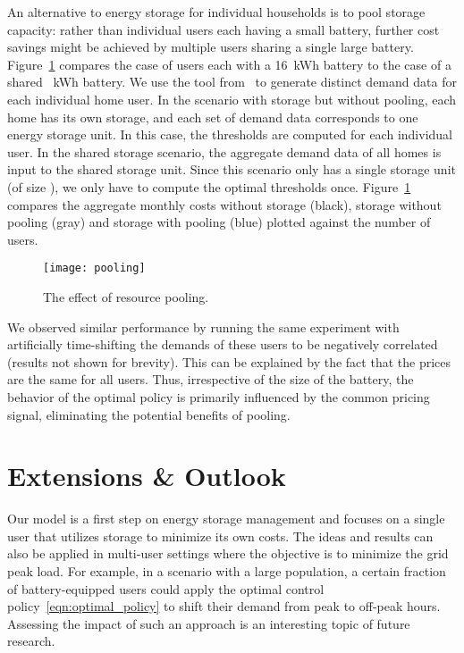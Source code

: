 \documentclass[journal]{IEEEtran}
\newcommand\1{\mathbf{1}}
\begin{document}
An alternative to energy storage for individual households is to pool storage capacity: rather than individual users each having a small battery, further cost savings might be achieved by multiple users sharing a single large battery. Figure~\ref{fig:pooling} compares the case of  users each with a 16~kWh battery to the case of a shared ~kWh battery. We use the tool from~\cite{RTIC10} to generate distinct demand data for each individual home user. In the scenario with storage but without pooling, each home has its own storage, and each set of demand data corresponds to one energy storage unit. In this case, the thresholds are computed for each individual user. In the shared storage scenario, the aggregate demand data of all  homes is input to the shared storage unit. Since this scenario only has a single storage unit (of size ), we only have to compute the optimal thresholds once.
Figure~\ref{fig:pooling} compares the aggregate monthly costs without storage (black), storage without pooling (gray) and storage with pooling (blue) plotted against the number of users.
\begin{figure}[h]
    \begin{center}
        \texttt{[image: pooling]}
    \end{center}
    \caption{The effect of resource pooling.}
    \label{fig:pooling}
\end{figure}

We observed similar performance by running the same experiment with artificially time-shifting the demands of these users to be negatively correlated (results not shown for brevity).
This can be explained by the fact that the prices are the same for all users. Thus, irrespective of the size of the battery, the behavior of the optimal policy is primarily influenced by the common pricing signal, eliminating the potential benefits of pooling. 



\section{Extensions \& Outlook}\label{sec:outlook}

Our model is a first step on energy storage management and focuses on a single user that utilizes storage to minimize its own costs.  The ideas and results can also be applied in multi-user settings where the objective is to minimize the grid peak load. For example, in a scenario with a large population, a certain fraction of battery-equipped users could apply the optimal control policy~\eqref{eqn:optimal_policy} to shift their demand from peak to off-peak hours.  Assessing the impact of such an approach is an interesting topic of future research.
\end{document}
